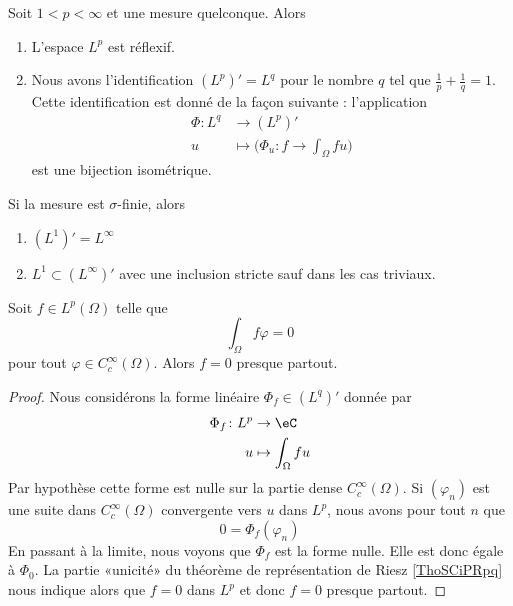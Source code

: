 \begin{theorem} \label{ThoSCiPRpq}
    Soit \( 1<p<\infty\) et une mesure quelconque. Alors
    \begin{enumerate}
        \item
            L'espace \( L^p\) est réflexif.
        \item
            Nous avons l'identification \( (L^p)'=L^q\) pour le nombre \( q\) tel que \( \frac{1}{ p }+\frac{1}{ q }=1\). Cette identification est donné de la façon suivante : l'application
            \begin{equation}
                \begin{aligned}
                    \Phi\colon L^q&\to (L^p)' \\
                    u&\mapsto \Big( \Phi_u\colon f\to \int_{\Omega}fu \Big) 
                \end{aligned}
            \end{equation}
            est une bijection isométrique.
    \end{enumerate}
    Si la mesure est \( \sigma\)-finie, alors
    \begin{enumerate}
        \item
            \( (L^1)'=L^{\infty}\)
        \item
            \( L^1\subset (L^{\infty})' \) avec une inclusion stricte sauf dans les cas triviaux.
    \end{enumerate}
\end{theorem}

\begin{proposition} \label{PropUKLZZZh}
    Soit \( f\in L^p(\Omega)\) telle que
    \begin{equation}
        \int_{\Omega}f\varphi=0
    \end{equation}
    pour tout \( \varphi\in C^{\infty}_c(\Omega)\). Alors \( f=0\) presque partout.
\end{proposition}

\begin{proof}
    Nous considérons la forme linéaire \( \Phi_f\in (L^q)'\) donnée par
    \begin{equation}
        \begin{aligned}
            \Phi_f\colon L^p&\to \eC \\
            u&\mapsto \int_{\Omega}fu
        \end{aligned}
    \end{equation}
    Par hypothèse cette forme est nulle sur la partie dense \(  C^{\infty}_c(\Omega)\). Si \( (\varphi_n)\) est une suite dans \(  C^{\infty}_c(\Omega)\) convergente vers \( u\) dans \( L^p\), nous avons pour tout \( n\) que
    \begin{equation}
        0=\Phi_f(\varphi_n)
    \end{equation}
    En passant à la limite, nous voyons que \( \Phi_f\) est la forme nulle. Elle est donc égale à \( \Phi_0\). La partie «unicité» du théorème de représentation de Riesz \ref{ThoSCiPRpq} nous indique alors que \( f=0\) dans \( L^p\) et donc \( f=0\) presque partout.
\end{proof}

